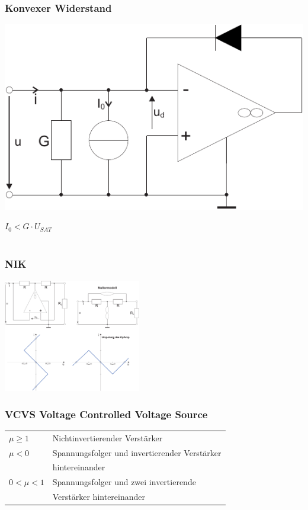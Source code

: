 \documentclass[a4paper,twocolumn,10pt]{article}
\begin{document}
\subsubsection*{Konvexer Widerstand}
\begin{minipage}[b]{0.25\textwidth}
\includegraphics[width=\textwidth]{Grafiken/OP_Rkonvex}
\end{minipage}
\hfill
\begin{minipage}[b]{0.2\textwidth}
$I_0<G\cdot U_{SAT}$\\\\
\end{minipage}

\subsubsection*{NIK}
\includegraphics[width=0.45\textwidth]{Grafiken/OP_NIK}

\subsubsection*{VCVS Voltage Controlled Voltage Source}
\begin{tabular}{ll}
$\mu\geq 1$ & Nichtinvertierender Verstärker\\
$\mu<0$ & Spannungsfolger und invertierender Verstärker\\
& hintereinander\\
$0<\mu<1$ & Spannungsfolger und zwei invertierende\\
& Verstärker hintereinander
\end{tabular}
\end{document}
